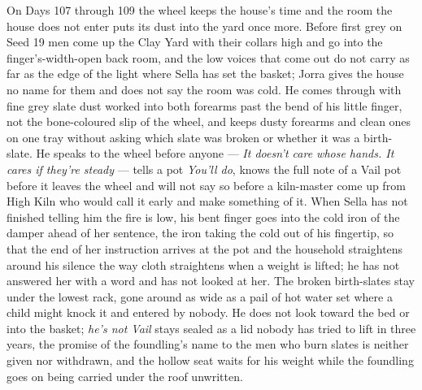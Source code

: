\documentclass{design/chronicle}
\begin{document}
{On Days 107 through 109 the wheel keeps the house’s time and the room the house does not enter puts its dust into the yard once more. Before first grey on Seed 19 men come up the Clay Yard with their collars high and go into the finger’s-width-open back room, and the low voices that come out do not carry as far as the edge of the light where Sella has set the basket; Jorra gives the house no name for them and does not say the room was cold. He comes through with fine grey slate dust worked into both forearms past the bend of his little finger, not the bone-coloured slip of the wheel, and keeps dusty forearms and clean ones on one tray without asking which slate was broken or whether it was a birth-slate. He speaks to the wheel before anyone — \emph{It doesn’t care whose hands. It cares if they’re steady} — tells a pot \emph{You’ll do}, knows the full note of a Vail pot before it leaves the wheel and will not say so before a kiln-master come up from High Kiln who would call it early and make something of it. When Sella has not finished telling him the fire is low, his bent finger goes into the cold iron of the damper ahead of her sentence, the iron taking the cold out of his fingertip, so that the end of her instruction arrives at the pot and the household straightens around his silence the way cloth straightens when a weight is lifted; he has not answered her with a word and has not looked at her. The broken birth-slates stay under the lowest rack, gone around as wide as a pail of hot water set where a child might knock it and entered by nobody. He does not look toward the bed or into the basket; \emph{he’s not Vail} stays sealed as a lid nobody has tried to lift in three years, the promise of the foundling’s name to the men who burn slates is neither given nor withdrawn, and the hollow seat waits for his weight while the foundling goes on being carried under the roof unwritten.

}
\end{document}
